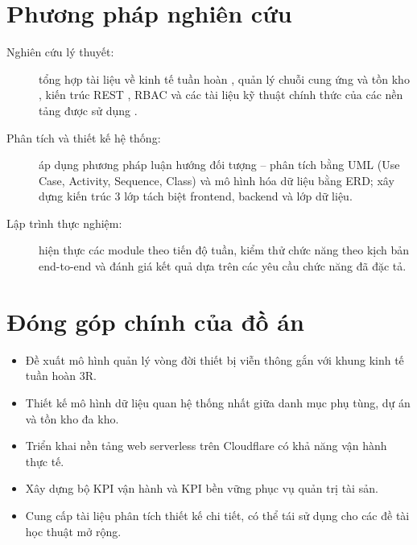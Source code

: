 \section{Phương pháp nghiên cứu}
\label{sec:phuongphap}
\begin{description}
    \item[Nghiên cứu lý thuyết:] tổng hợp tài liệu về kinh tế tuần hoàn \cite{ellenmacarthur2013, geissdoerfer2017}, quản lý chuỗi cung ứng và tồn kho \cite{chopra2019scm, apics2018}, kiến trúc REST \cite{fielding2000}, RBAC \cite{sandhu1996rbac} và các tài liệu kỹ thuật chính thức của các nền tảng được sử dụng \cite{cloudflareWorkers, cloudflareD1, honoFramework, reactDoc, tailwindDoc}.
    \item[Phân tích và thiết kế hệ thống:] áp dụng phương pháp luận hướng đối tượng -- phân tích bằng UML (Use Case, Activity, Sequence, Class) và mô hình hóa dữ liệu bằng ERD; xây dựng kiến trúc 3 lớp tách biệt frontend, backend và lớp dữ liệu.
    \item[Lập trình thực nghiệm:] hiện thực các module theo tiến độ tuần, kiểm thử chức năng theo kịch bản end-to-end và đánh giá kết quả dựa trên các yêu cầu chức năng đã đặc tả.
\end{description}

\section{Đóng góp chính của đồ án}
\begin{itemize}[leftmargin=1.2cm]
    \item Đề xuất mô hình quản lý vòng đời thiết bị viễn thông gắn với khung kinh tế tuần hoàn 3R.
    \item Thiết kế mô hình dữ liệu quan hệ thống nhất giữa danh mục phụ tùng, dự án và tồn kho đa kho.
    \item Triển khai nền tảng web serverless trên Cloudflare có khả năng vận hành thực tế.
    \item Xây dựng bộ KPI vận hành và KPI bền vững phục vụ quản trị tài sản.
    \item Cung cấp tài liệu phân tích thiết kế chi tiết, có thể tái sử dụng cho các đề tài học thuật mở rộng.
\end{itemize}

